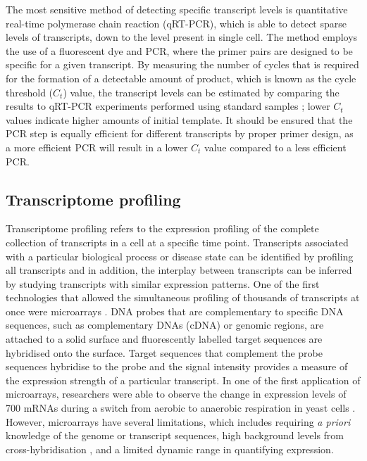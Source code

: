 The most sensitive method of detecting specific transcript levels is quantitative real-time polymerase chain reaction (qRT-PCR), which is able to detect sparse levels of transcripts, down to the level present in single cell. The method employs the use of a fluorescent dye and PCR, where the primer pairs are designed to be specific for a given transcript. By measuring the number of cycles that is required for the formation of a detectable amount of product, which is known as the cycle threshold ($C_{t}$) value, the transcript levels can be estimated by comparing the results to qRT-PCR experiments performed using standard samples \citep{pmid11846609}; lower $C_{t}$ values indicate higher amounts of initial template. It should be ensured that the PCR step is equally efficient for different transcripts by proper primer design, as a more efficient PCR will result in a lower $C_{t}$ value compared to a less efficient PCR.

\subsection{Transcriptome profiling}

Transcriptome profiling refers to the expression profiling of the complete collection of transcripts in a cell at a specific time point. Transcripts associated with a particular biological process or disease state can be identified by profiling all transcripts and in addition, the interplay between transcripts can be inferred by studying transcripts with similar expression patterns. One of the first technologies that allowed the simultaneous profiling of thousands of transcripts at once were microarrays \citep{pmid7569999}. DNA probes that are complementary to specific DNA sequences, such as complementary DNAs (cDNA) or genomic regions, are attached to a solid surface and fluorescently labelled target sequences are hybridised onto the surface. Target sequences that complement the probe sequences hybridise to the probe and the signal intensity provides a measure of the expression strength of a particular transcript. In one of the first application of microarrays, researchers were able to observe the change in expression levels of 700 mRNAs during a switch from aerobic to anaerobic respiration in yeast cells \citep{pmid9381177}. However, microarrays have several limitations, which includes requiring \textit{a priori} knowledge of the genome or transcript sequences, high background levels from cross-hybridisation \citep{pmid16749918}, and a limited dynamic range in quantifying expression.

